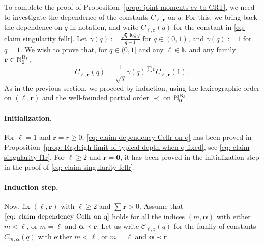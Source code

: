 \documentclass{article}
\theoremstyle{remark}
\newcommand{\bN}{\mathbb{N}}
\newcommand{\pairs}{{\rm B}}
\newcommand{\cC}{\mathcal{C}}
\newcommand{\br}{{\mathbf{r}}}
\begin{document}
To complete the proof of Proposition~\ref{prop: joint moments cv to CRT}, we need to investigate the dependence of the constants $C_{\ell, \br}$ on $q$.
For this, we bring back the dependence on $q$ in notation, and write $C_{\ell,\br}(q)$ for the constant in \eqref{eq: claim singularity fellr}.
Let $\gamma(q) := \frac{\sqrt q \log q}{q-1}$ for $q\in(0,1)$, and $\gamma(q) := 1$ for $q=1$.
We wish to prove that, for $q\in(0,1]$ and any $\ell\in\bN$ and any family $\br \in \bN_0^{\pairs_\ell}$,
\begin{equation}\label{eq: claim dependency Cellr on q}
    C_{\ell,\br}(q) = \frac{1}{\sqrt q} \gamma(q)^{\sum\br} C_{\ell,\br}(1) \,.
\end{equation}
As in the previous section, we proceed by induction, using the lexicographic order on $(\ell,\br)$ and the well-founded partial order $\prec$ on $\bN_0^{\pairs_\ell}$.

\paragraph{Initialization.}
For $\ell=1$ and $\br = r \ge0$, \eqref{eq: claim dependency Cellr on q} has been proved in Proposition~\ref{prop: Rayleigh limit of typical depth when q fixed}, see \eqref{eq: claim singularity f1r}.
For $\ell\ge2$ and $\br = \bm0$, it has been proved in the initialization step in the proof of \eqref{eq: claim singularity fellr}.

\paragraph{Induction step.}
Now, fix $(\ell,\br)$ with $\ell\ge2$ and $\sum\br > 0$.
Assume that $\eqref{eq: claim dependency Cellr on q}$ holds for all the indices $(m,\bm\alpha)$ with either $m<\ell$, or $m=\ell$ and $\bm{\alpha}\prec\br$.
Let us write $\cC_{\ell, \br}(q)$ for the family of constants $C_{m,\bm\alpha}(q)$ with either $m<\ell$, or $m=\ell$ and $\bm{\alpha}\prec\br$.
\end{document}
